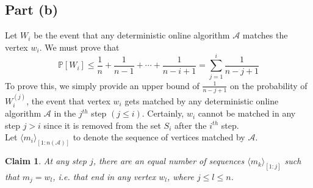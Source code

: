 \documentclass[11pt]{article}
\newtheorem{claim}{Claim}
\begin{document}
\subsection*{Part (b)}
Let $W_{i}$ be the event that any deterministic online algorithm $\mathcal{A}$
matches the vertex $w_{i}$. We must prove that
\begin{equation}
    \mathbb{P}[W_{i}] \leq \frac{1}{n} + \frac{1}{n-1} + \cdots + \frac{1}{n-i+1} = \sum_{j=1}^{i} \frac{1}{n-j+1}
\end{equation}
To prove this, we simply provide an upper bound of $\frac{1}{n-j+1}$ on the probability of $W_{i}^{(j)}$, the event that
vertex $w_{i}$ gets matched by any deterministic online algorithm $\mathcal{A}$ in the
$j^{th}$ step $(j \leq i)$. Certainly, $w_{i}$ cannot be matched in any step $j > i$ since
it is removed from the set $S_{i}$ after the $i^{th}$ step. \\
Let $\langle m_{i} \rangle_{[1:n(\mathcal{A})]}$ to denote the sequence of vertices matched by $\mathcal{A}$.
\begin{claim}
    \label{claim:valid}
    At any step $j$, there are an equal number of sequences $\langle m_{k} \rangle_{[1:j]}$ such that
    $m_{j} = w_{l}$, i.e. that end in any vertex $w_{l}$, where $j \leq l \leq n$.
\end{claim}
\end{document}
